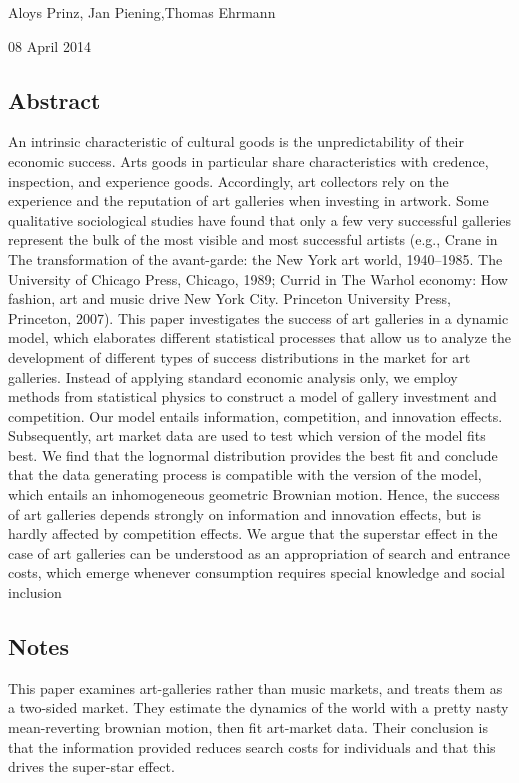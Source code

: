 \documentclass[12pt]{article}
\begin{document}
Aloys Prinz, Jan Piening,Thomas Ehrmann\par

08 April 2014\par

\subsection{Abstract}
An intrinsic characteristic of cultural goods is the unpredictability
of their economic success. Arts goods in particular share
characteristics with credence, inspection, and experience
goods. Accordingly, art collectors rely on the experience and the
reputation of art galleries when investing in artwork. Some
qualitative sociological studies have found that only a few very
successful galleries represent the bulk of the most visible and most
successful artists (e.g., Crane in The transformation of the
avant-garde: the New York art world, 1940–1985. The University of
Chicago Press, Chicago, 1989; Currid in The Warhol economy: How
fashion, art and music drive New York City. Princeton University
Press, Princeton, 2007). This paper investigates the success of art
galleries in a dynamic model, which elaborates different statistical
processes that allow us to analyze the development of different types
of success distributions in the market for art galleries. Instead of
applying standard economic analysis only, we employ methods from
statistical physics to construct a model of gallery investment and
competition. Our model entails information, competition, and
innovation effects. Subsequently, art market data are used to test
which version of the model fits best. We find that the lognormal
distribution provides the best fit and conclude that the data
generating process is compatible with the version of the model, which
entails an inhomogeneous geometric Brownian motion. Hence, the success
of art galleries depends strongly on information and innovation
effects, but is hardly affected by competition effects. We argue that
the superstar effect in the case of art galleries can be understood as
an appropriation of search and entrance costs, which emerge whenever
consumption requires special knowledge and social inclusion

\subsection{Notes}

This paper examines art-galleries rather than music markets, and
treats them as a two-sided market. They estimate the dynamics of the
world with a pretty nasty mean-reverting brownian motion, then fit
art-market data. Their conclusion is that the information provided
reduces search costs for individuals and that this drives the
super-star effect.
\end{document}
